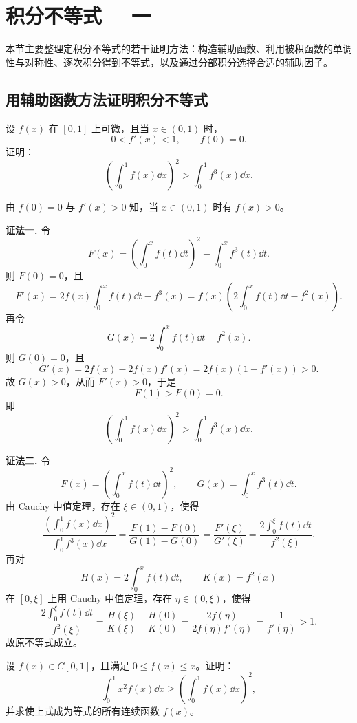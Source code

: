 \section{积分不等式~~ 一}

本节主要整理定积分不等式的若干证明方法：构造辅助函数、利用被积函数的单调性与对称性、逐次积分得到不等式，以及通过分部积分选择合适的辅助因子。

\subsection*{用辅助函数方法证明积分不等式}

\begin{problem}
	设 $f(x)$ 在 $[0,1]$ 上可微，且当 $x\in(0,1)$ 时，
	\[
	0<f'(x)<1,\qquad f(0)=0.
	\]
	证明：
	\[
	\left(\int_0^1 f(x)\dd x\right)^2>\int_0^1 f^3(x)\dd x.
	\]
\end{problem}

\begin{solution}
	由 $f(0)=0$ 与 $f'(x)>0$ 知，当 $x\in(0,1)$ 时有 $f(x)>0$。
	
	\textbf{证法一.} 令
	\[
	F(x)=\left(\int_0^x f(t)\dd t\right)^2-\int_0^x f^3(t)\dd t.
	\]
	则 $F(0)=0$，且
	\[
	F'(x)
	=2f(x)\int_0^x f(t)\dd t-f^3(x)
	=f(x)\left(2\int_0^x f(t)\dd t-f^2(x)\right).
	\]
	再令
	\[
	G(x)=2\int_0^x f(t)\dd t-f^2(x).
	\]
	则 $G(0)=0$，且
	\[
	G'(x)=2f(x)-2f(x)f'(x)=2f(x)(1-f'(x))>0.
	\]
	故 $G(x)>0$，从而 $F'(x)>0$，于是
	\[
	F(1)>F(0)=0.
	\]
	即
	\[
	\left(\int_0^1 f(x)\dd x\right)^2>\int_0^1 f^3(x)\dd x.
	\]
	
	\textbf{证法二.} 令
	\[
	F(x)=\left(\int_0^x f(t)\dd t\right)^2,\qquad
	G(x)=\int_0^x f^3(t)\dd t.
	\]
	由 Cauchy 中值定理，存在 $\xi\in(0,1)$，使得
	\[
	\frac{\left(\int_0^1 f(x)\dd x\right)^2}{\int_0^1 f^3(x)\dd x}
	=\frac{F(1)-F(0)}{G(1)-G(0)}
	=\frac{F'(\xi)}{G'(\xi)}
	=\frac{2\int_0^\xi f(t)\dd t}{f^2(\xi)}.
	\]
	再对
	\[
	H(x)=2\int_0^x f(t)\dd t,\qquad K(x)=f^2(x)
	\]
	在 $[0,\xi]$ 上用 Cauchy 中值定理，存在 $\eta\in(0,\xi)$，使得
	\[
	\frac{2\int_0^\xi f(t)\dd t}{f^2(\xi)}
	=\frac{H(\xi)-H(0)}{K(\xi)-K(0)}
	=\frac{2f(\eta)}{2f(\eta)f'(\eta)}
	=\frac1{f'(\eta)}>1.
	\]
	故原不等式成立。
\end{solution}

\begin{problem}
	设 $f(x)\in C[0,1]$，且满足 $0\leq f(x)\leq x$。证明：
	\[
	\int_0^1 x^2 f(x)\dd x\geq \left(\int_0^1 f(x)\dd x\right)^2,
	\]
	并求使上式成为等式的所有连续函数 $f(x)$。
\end{problem}

